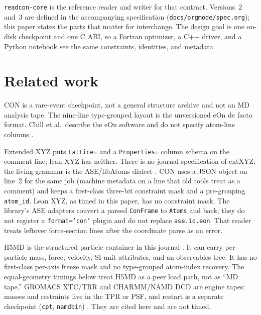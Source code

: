 \documentclass[preprint,12pt]{elsarticle}
\begin{document}
\texttt{readcon-core} is the reference reader and writer for that
contract. Versions~2 and~3 are defined in the accompanying
specification (\texttt{docs/orgmode/spec.org}); this paper states the
parts that matter for interchange. The design goal is one on-disk
checkpoint and one C ABI, so a Fortran optimizer, a C++ driver, and
a Python notebook see the same constraints, identities, and
metadata.

\section{Related work}

CON is a rare-event checkpoint, not a general structure archive and
not an MD analysis tape. The nine-line type-grouped layout is the
unversioned eOn de facto format. Chill et al.\ describe the eOn
software and do not specify atom-line columns
\cite{chillEONSoftwareLong2014}.

Extended XYZ puts \texttt{Lattice=} and a
\texttt{Properties=} column schema on the comment line; lean XYZ has
neither. There is no journal specification of extXYZ; the living
grammar is the ASE/libAtoms dialect
\cite{larsenAtomicSimulationEnvironment2017}. CON uses a JSON object
on line~2 for the same job (machine metadata on a line that old
tools treat as a comment) and keeps a first-class three-bit
constraint mask and a pre-grouping \texttt{atom\_id}. Lean XYZ, as
timed in this paper, has no constraint mask. The library's ASE
adapters convert a parsed \texttt{ConFrame} to \texttt{Atoms} and
back; they do not register a \texttt{format='con'} plugin and do
not replace \texttt{ase.io.eon}. That reader treats leftover
force-section lines after the coordinate parse as an error.

H5MD is the structured particle container in this journal
\cite{deBuylH5MDStructuredEfficient2014}. It can carry per-particle
mass, force, velocity, SI unit attributes, and an observables tree.
It has no first-class per-axis freeze mask and no type-grouped
atom-index recovery. The equal-geometry timings below treat H5MD as
a peer load path, not as ``MD tape.'' GROMACS XTC/TRR and CHARMM/NAMD
DCD are engine tapes: masses and restraints live in the TPR or PSF,
and restart is a separate checkpoint (\texttt{cpt},
\texttt{namdbin}) \cite{abrahamGromacsHighPerformance2015}. They are
cited here and are not timed.
\end{document}
